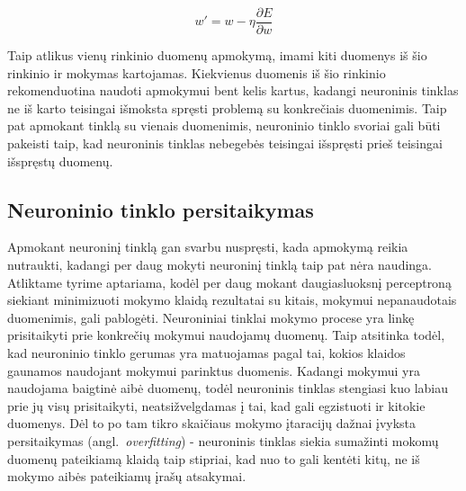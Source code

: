 \documentclass{VUMIFPSbakalaurinis}
\begin{document}
\begin{equation}\label{eq:learning}
w' = w - \eta\frac{\partial E}{\partial w}
\end{equation}

Taip atlikus vienų rinkinio duomenų apmokymą, imami kiti duomenys iš šio rinkinio ir mokymas kartojamas.
Kiekvienus duomenis iš šio rinkinio rekomenduotina naudoti apmokymui bent kelis kartus, kadangi neuroninis tinklas ne iš karto teisingai išmoksta spręsti problemą su konkrečiais duomenimis.
Taip pat apmokant tinklą su vienais duomenimis, neuroninio tinklo svoriai gali būti pakeisti taip, kad neuroninis tinklas nebegebės teisingai išspręsti prieš teisingai išspręstų duomenų.





\subsection{Neuroninio tinklo persitaikymas}


Apmokant neuroninį tinklą gan svarbu nuspręsti, kada apmokymą reikia nutraukti, kadangi per daug mokyti neuroninį tinklą taip pat nėra naudinga.
Atliktame tyrime \cite[114~psl.]{overfitting} aptariama, kodėl per daug mokant daugiasluoksnį perceptroną siekiant minimizuoti mokymo klaidą rezultatai su kitais, mokymui nepanaudotais duomenimis, gali pablogėti.
Neuroniniai tinklai mokymo procese yra linkę prisitaikyti prie konkrečių mokymui naudojamų duomenų.
Taip atsitinka todėl, kad neuroninio tinklo gerumas yra matuojamas pagal tai, kokios klaidos gaunamos naudojant mokymui parinktus duomenis.
Kadangi mokymui yra naudojama baigtinė aibė duomenų, todėl neuroninis tinklas stengiasi kuo labiau prie jų visų prisitaikyti, neatsižvelgdamas į tai, kad gali egzistuoti ir kitokie duomenys.
Dėl to po tam tikro skaičiaus mokymo įtaracijų dažnai įvyksta persitaikymas (angl.~\textit{overfitting}) - neuroninis tinklas siekia sumažinti mokomų duomenų pateikiamą klaidą taip stipriai, kad nuo to gali kentėti kitų, ne iš mokymo aibės pateikiamų įrašų atsakymai.
\end{document}
